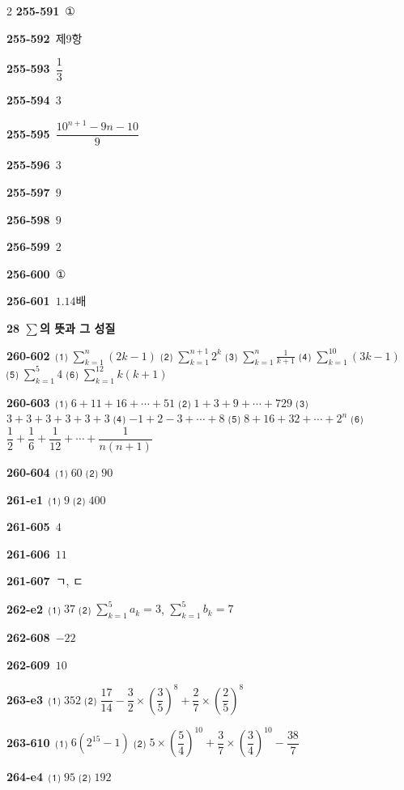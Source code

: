 \documentclass[10pt,a4paper]{article}
\begin{document}
\begin{multicols}{2}
\noindent\textbf{255-591}\ ①\par
\noindent\textbf{255-592}\ 제$9$항\par
\noindent\textbf{255-593}\ $\dfrac{1}{3}$\par
\noindent\textbf{255-594}\ $3$\par
\noindent\textbf{255-595}\ $\dfrac{10^{n+1}-9n-10}{9}$\par
\noindent\textbf{255-596}\ $3$\par
\noindent\textbf{255-597}\ $9$\par
\noindent\textbf{256-598}\ $9$\par
\noindent\textbf{256-599}\ $2$\par
\noindent\textbf{256-600}\ ①\par
\noindent\textbf{256-601}\ $1.14$배\par
\noindent\textbf{28 $\sum$의 뜻과 그 성질}\par\smallskip
\noindent\textbf{260-602}\ ⑴ $\displaystyle\sum_{k=1}^{n}(2k-1)$ ⑵ $\displaystyle\sum_{k=1}^{n+1}2^k$ ⑶ $\displaystyle\sum_{k=1}^{n}\frac{1}{k+1}$ ⑷ $\displaystyle\sum_{k=1}^{10}(3k-1)$ ⑸ $\displaystyle\sum_{k=1}^{5}4$ ⑹ $\displaystyle\sum_{k=1}^{12}k(k+1)$\par
\noindent\textbf{260-603}\ ⑴ $6+11+16+\cdots+51$ ⑵ $1+3+9+\cdots+729$ ⑶ $3+3+3+3+3+3$ ⑷ $-1+2-3+\cdots+8$ ⑸ $8+16+32+\cdots+2^n$ ⑹ $\dfrac{1}{2}+\dfrac{1}{6}+\dfrac{1}{12}+\cdots+\dfrac{1}{n(n+1)}$\par
\noindent\textbf{260-604}\ ⑴ $60$ ⑵ $90$\par
\noindent\textbf{261-e1}\ ⑴ $9$ ⑵ $400$\par
\noindent\textbf{261-605}\ $4$\par
\noindent\textbf{261-606}\ $11$\par
\noindent\textbf{261-607}\ ㄱ, ㄷ\par
\noindent\textbf{262-e2}\ ⑴ $37$ ⑵ $\displaystyle\sum_{k=1}^{5}a_k=3$, $\displaystyle\sum_{k=1}^{5}b_k=7$\par
\noindent\textbf{262-608}\ $-22$\par
\noindent\textbf{262-609}\ $10$\par
\noindent\textbf{263-e3}\ ⑴ $352$ ⑵ $\dfrac{17}{14}-\dfrac{3}{2}\times\left(\dfrac{3}{5}\right)^{8}+\dfrac{2}{7}\times\left(\dfrac{2}{5}\right)^{8}$\par
\noindent\textbf{263-610}\ ⑴ $6(2^{15}-1)$ ⑵ $5\times\left(\dfrac{5}{4}\right)^{10}+\dfrac{3}{7}\times\left(\dfrac{3}{4}\right)^{10}-\dfrac{38}{7}$\par
\noindent\textbf{264-e4}\ ⑴ $95$ ⑵ $192$\par

\end{multicols}
\end{document}
